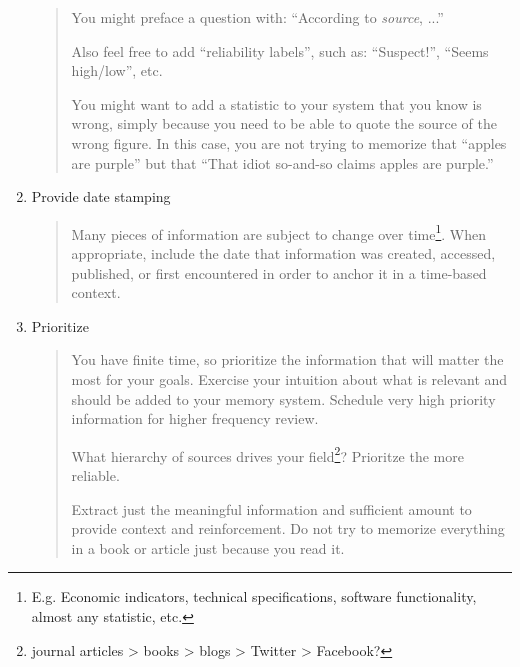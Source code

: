 \documentclass[]{tufte-handout}
\begin{document}
\begin{enumerate}
\begin{quote}
You might preface a question with: ``According to \textit{source}, ...''

Also feel free to add ``reliability labels'', such as: ``Suspect!'', ``Seems high/low'', etc.

You might want to add a statistic to your system that you know is wrong, simply because you need to be able to quote the source of the wrong figure. In this case, you are not trying to memorize that ``apples are purple'' but that ``That idiot so-and-so claims apples are purple.''
\end{quote}

\item{Provide date stamping}

\begin{quote}
Many pieces of information are subject to change over time\footnote{E.g. Economic indicators, technical specifications, software functionality, almost any statistic, etc.}. When appropriate, include the date that information was created, accessed, published, or first encountered in order to anchor it in a time-based context.
\end{quote}

\newpage

\item{Prioritize}

\begin{quote}
You have finite time, so prioritize the information that will matter the most for your goals. Exercise your intuition about what is relevant and should be added to your memory system. Schedule very high priority information for higher frequency review.

What hierarchy of sources drives your field\footnote{journal articles > books > blogs > Twitter > Facebook?}? Prioritze the more reliable.

Extract just the meaningful information and sufficient amount to provide context and reinforcement. Do not try to memorize everything in a book or article just because you read it.
\end{quote}

\end{enumerate}



\end{document}
